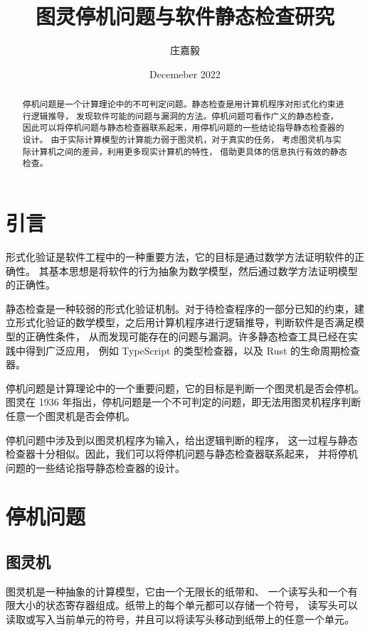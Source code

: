 \documentclass[twocolumn]{ctexart}
\title{图灵停机问题与软件静态检查研究}
\author{庄嘉毅}
\date{Decemeber 2022}
\begin{document}
\maketitle

\begin{abstract}
    停机问题是一个计算理论中的不可判定问题。静态检查是用计算机程序对形式化约束进行逻辑推导，
    发现软件可能的问题与漏洞的方法。停机问题可看作广义的静态检查，
    因此可以将停机问题与静态检查器联系起来，用停机问题的一些结论指导静态检查器的设计。
    由于实际计算模型的计算能力弱于图灵机，对于真实的任务，
    考虑图灵机与实际计算机之间的差异，利用更多现实计算机的特性，
    借助更具体的信息执行有效的静态检查。
\end{abstract}

\section{引言}

形式化验证是软件工程中的一种重要方法，它的目标是通过数学方法证明软件的正确性。
其基本思想是将软件的行为抽象为数学模型，然后通过数学方法证明模型的正确性。

静态检查是一种较弱的形式化验证机制。对于待检查程序的一部分已知的约束，建立形式化验证的数学模型，之后用计算机程序进行逻辑推导，判断软件是否满足模型的正确性条件，
从而发现可能存在的问题与漏洞。许多静态检查工具已经在实践中得到广泛应用，
例如 TypeScript 的类型检查器\cite{typescript}，以及 Rust 的生命周期检查器\cite{rustlifetimes}。

停机问题是计算理论中的一个重要问题，它的目标是判断一个图灵机是否会停机。
图灵在 1936 年指出，停机问题是一个不可判定的问题，即无法用图灵机程序判断任意一个图灵机是否会停机\cite{turing1936computable}。

停机问题中涉及到以图灵机程序为输入，给出逻辑判断的程序，
这一过程与静态检查器十分相似。因此，我们可以将停机问题与静态检查器联系起来，
并将停机问题的一些结论指导静态检查器的设计。

\section{停机问题}

\subsection{图灵机}

图灵机是一种抽象的计算模型，它由一个无限长的纸带和、
一个读写头和一个有限大小的状态寄存器组成。纸带上的每个单元都可以存储一个符号，
读写头可以读取或写入当前单元的符号，并且可以将读写头移动到纸带上的任意一个单元。
\end{document}
